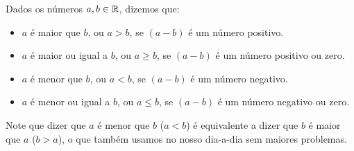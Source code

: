 

\begin{obs}
Dados os números $a, b \in \mathbb{R}$, dizemos que:

\begin{itemize}
\item $a$ é maior que $b$, ou $a > b$, se $(a - b)$ é um número positivo.
\item $a$ é maior ou igual a $b$, ou $a \geq b$, se $(a - b)$ é um número positivo ou zero.
\item $a$ é menor que $b$, ou $a < b$, se $(a - b)$ é um número negativo.
\item $a$ é menor ou igual a $b$, ou $a \leq b$, se $(a - b)$ é um número negativo ou zero.
\end{itemize}
\end{obs}

Note que dizer que $a$ é menor que $b$ ($a < b$) é equivalente a dizer que $b$ é maior que $a$ ($b > a$), o que também usamos no nosso dia-a-dia sem maiores problemas.


